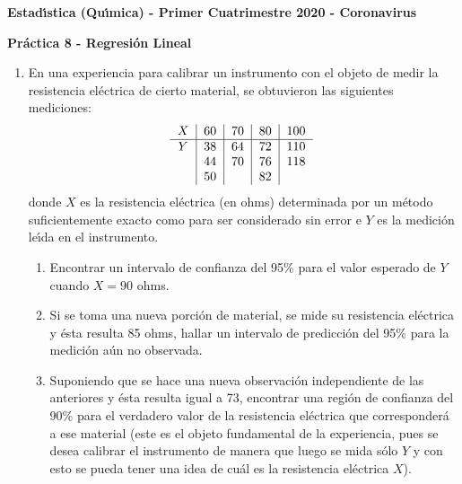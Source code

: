 \documentclass[11pt,a4paper,twoside]{article}%
\begin{document}
\begin{center}
\textbf{\textsf{Estad\'{\i}stica (Qu\'{\i}mica) - Primer Cuatrimestre 2020 - Coronavirus}}

\textbf{Pr\'{a}ctica 8 - Regresi\'{o}n Lineal\vspace{-0.1in}}

\end{center}

\begin{enumerate}
\item En una experiencia para calibrar un instrumento con el objeto de medir
la resistencia el\'{e}ctrica de cierto material, se obtuvieron las siguientes
mediciones:%
\[
\text{%
\begin{tabular}
[c]{ccccc}%
$X$ & \multicolumn{1}{|c}{60} & \multicolumn{1}{|c}{70} &
\multicolumn{1}{|c}{80} & \multicolumn{1}{|c}{100}\\\hline
$Y$ & \multicolumn{1}{|c}{38} & \multicolumn{1}{|c}{64} &
\multicolumn{1}{|c}{72} & \multicolumn{1}{|c}{110}\\
& \multicolumn{1}{|c}{44} & \multicolumn{1}{|c}{70} & \multicolumn{1}{|c}{76}
& \multicolumn{1}{|c}{118}\\
& \multicolumn{1}{|c}{50} & \multicolumn{1}{|c}{} & \multicolumn{1}{|c}{82} &
\multicolumn{1}{|c}{}%
\end{tabular}
}%
\]
donde $X$ es la resistencia el\'{e}ctrica (en ohms) determinada por un
m\'{e}todo suficientemente exacto como para ser considerado sin error e $Y$ es
la medici\'{o}n le\'{\i}da en el instrumento.

\begin{enumerate}
\item Encontrar un intervalo de confianza del 95\% para el valor esperado de
$Y$ cuando $X=90$ ohms.

\item Si se toma una nueva porci\'{o}n de material, se mide su resistencia
el\'{e}ctrica y \'{e}sta resulta 85 ohms, hallar un intervalo de
predicci\'{o}n del 95\% para la medici\'{o}n a\'{u}n no observada.

\item Suponiendo que se hace una nueva observaci\'{o}n independiente de las
anteriores y \'{e}sta resulta igual a 73, encontrar una regi\'{o}n de
confianza del 90\% para el verdadero valor de la resistencia el\'{e}ctrica que
corresponder\'{a} a ese material (este es el objeto fundamental de la
experiencia, pues se desea calibrar el instrumento de manera que luego se mida
s\'{o}lo $Y$ y con esto se pueda tener una idea de cu\'{a}l es la resistencia
el\'{e}ctrica $X$).
\end{enumerate}


\end{enumerate}
\end{document}
